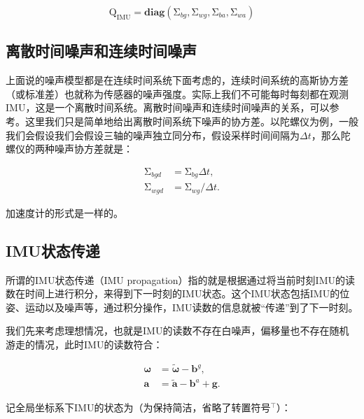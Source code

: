 \begin{equation}
    \mathrm{Q}_{\textrm{IMU}} = \mathbf{diag}(
        \mathrm\Sigma_{bg},
        \mathrm\Sigma_{wg},
        \mathrm\Sigma_{ba},
        \mathrm\Sigma_{wa}
    )
\end{equation}

\subsection{离散时间噪声和连续时间噪声}

上面说的噪声模型都是在连续时间系统下面考虑的，连续时间系统的高斯协方差（或标准差）也就称为传感器的噪声强度。实际上我们不可能每时每刻都在观测IMU，这是一个离散时间系统。离散时间噪声和连续时间噪声的关系，可以参考\citep{smith1978exact}。这里我们只是简单地给出离散时间系统下噪声的协方差。以陀螺仪为例，一般我们会假设我们会假设三轴的噪声独立同分布，假设采样时间间隔为$\Delta t$，那么陀螺仪的两种噪声协方差就是：

\begin{equation}
\begin{aligned}
    \mathrm\Sigma_{bgd} &= \mathrm\Sigma_{bg} \Delta t,  \\
    \mathrm\Sigma_{wgd} &= \mathrm\Sigma_{wg} / \Delta t.
\end{aligned}
\end{equation}

加速度计的形式是一样的。

\subsection{IMU状态传递}

所谓的IMU状态传递（IMU propagation）指的就是根据通过将当前时刻IMU的读数在时间上进行积分，来得到下一时刻的IMU状态。这个IMU状态包括IMU的位姿、运动以及噪声等，通过积分操作，IMU读数的信息就被“传递”到了下一时刻。

我们先来考虑理想情况，也就是IMU的读数不存在白噪声，偏移量也不存在随机游走的情况，此时IMU的读数符合：

\begin{equation}
\begin{aligned}
    \bm\omega  &= \tilde{\bm\omega} - \mathbf{b}^g, \\
    \mathbf{a} &= \tilde{\mathbf a} - \mathbf{b}^a + \mathbf{g}.
\end{aligned}
\end{equation}

记全局坐标系下IMU的状态为（为保持简洁，省略了转置符号${}^\top$）：

